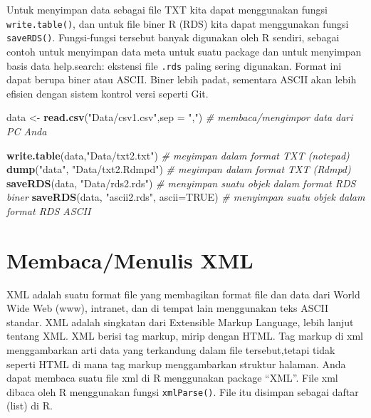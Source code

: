 \documentclass[
]{book}
\newenvironment{Shaded}{\begin{snugshade}}{\end{snugshade}}
\newcommand{\CommentTok}[1]{\textcolor[rgb]{0.56,0.35,0.01}{\textit{#1}}}
\newcommand{\DataTypeTok}[1]{\textcolor[rgb]{0.13,0.29,0.53}{#1}}
\newcommand{\KeywordTok}[1]{\textcolor[rgb]{0.13,0.29,0.53}{\textbf{#1}}}
\newcommand{\NormalTok}[1]{#1}
\newcommand{\OtherTok}[1]{\textcolor[rgb]{0.56,0.35,0.01}{#1}}
\newcommand{\StringTok}[1]{\textcolor[rgb]{0.31,0.60,0.02}{#1}}
\begin{document}
Untuk menyimpan data sebagai file TXT kita dapat menggunakan fungsi \texttt{write.table()}, dan untuk file biner R (RDS) kita dapat menggunakan fungsi \texttt{saveRDS()}. Fungsi-fungsi tersebut banyak digunakan oleh R sendiri, sebagai contoh untuk menyimpan data meta untuk suatu package dan untuk menyimpan basis data help.search: ekstensi file \texttt{.rds} paling sering digunakan. Format ini dapat berupa biner atau ASCII. Biner lebih padat, sementara ASCII akan lebih efisien dengan sistem kontrol versi seperti Git.

\begin{Shaded}
\begin{Highlighting}[]
\NormalTok{data <-}\StringTok{ }\KeywordTok{read.csv}\NormalTok{(}\StringTok{"Data/csv1.csv"}\NormalTok{,}\DataTypeTok{sep =} \StringTok{","}\NormalTok{)        }\CommentTok{# membaca/mengimpor data dari PC Anda}

\KeywordTok{write.table}\NormalTok{(data,}\StringTok{"Data/txt2.txt"}\NormalTok{)                  }\CommentTok{# meyimpan dalam format TXT (notepad)}
\KeywordTok{dump}\NormalTok{(}\StringTok{"data"}\NormalTok{, }\StringTok{"Data/txt2.Rdmpd"}\NormalTok{)                    }\CommentTok{# meyimpan dalam format TXT (Rdmpd)}
\KeywordTok{saveRDS}\NormalTok{(data, }\StringTok{"Data/rds2.rds"}\NormalTok{)                     }\CommentTok{# menyimpan suatu objek dalam format RDS biner}
\KeywordTok{saveRDS}\NormalTok{(data, }\StringTok{"ascii2.rds"}\NormalTok{, }\DataTypeTok{ascii=}\OtherTok{TRUE}\NormalTok{)            }\CommentTok{# menyimpan suatu objek dalam format RDS ASCII}
\end{Highlighting}
\end{Shaded}

\hypertarget{membacamenulis-xml}{%
\section{Membaca/Menulis XML}\label{membacamenulis-xml}}

XML adalah suatu format file yang membagikan format file dan data dari World Wide Web (www), intranet, dan di tempat lain menggunakan teks ASCII standar. XML adalah singkatan dari Extensible Markup Language, lebih lanjut tentang XML. XML berisi tag markup, mirip dengan HTML. Tag markup di xml menggambarkan arti data yang terkandung dalam file tersebut,tetapi tidak seperti HTML di mana tag markup menggambarkan struktur halaman. Anda dapat membaca suatu file xml di R menggunakan package ``XML''. File xml dibaca oleh R menggunakan fungsi \texttt{xmlParse()}. File itu disimpan sebagai daftar (list) di R.
\end{document}
